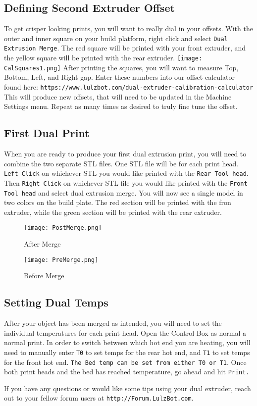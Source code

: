 \subsection{Defining Second Extruder Offset}
To get crisper looking prints, you will want to really dial in your offsets. With the outer and inner square on your build platform, right click and select \texttt{Dual Extrusion Merge}. The red square will be printed with your front extruder, and the yellow square will be printed with the rear extruder.
\texttt{[image: CalSquares1.png]}
After printing the squares, you will want to measure Top, Bottom, Left, and Right gap. Enter these numbers into our offset calculator found here: \texttt{https://www.lulzbot.com/dual-extruder-calibration-calculator} This will produce new offsets, that will need to be updated in the Machine Settings menu. Repeat as many times as desired to truly fine tune the offset. 

\subsection{First Dual Print}
When you are ready to produce your first dual extrusion print, you will need to combine the two separate STL files. One STL file will be for each print head. \texttt{Left Click} on whichever STL you would like printed with the \texttt{Rear Tool head}. Then \texttt{Right Click} on whichever STL file you would like printed with the \texttt{Front Tool head} and select dual extrusion merge. You will now see a single model in two colors on the build plate. The red section will be printed with the fron extruder, while the green section will be printed with the rear extruder. 
\begin{figure}[H]
\centering
\texttt{[image: PostMerge.png]}
\caption{After Merge}
\label{fig:After Merge}
\end{figure}

\begin{figure}
\centering
\texttt{[image: PreMerge.png]}
\caption{Before Merge}
\label{fig:Before Merge}
\end{figure}

\subsection{Setting Dual Temps}
After your object has been merged as intended, you will need to set the individual temperatures for each print head. Open the Control Box as normal a normal print. In order to switch between which hot end you are heating, you will need to manually enter \texttt{T0} to set temps for the rear hot end, and \texttt{T1} to set temps for the front hot end. \texttt{The Bed temp can be set from either T0 or T1}. Once both print heads and the bed has reached temperature, go ahead and hit \texttt{Print.}

If you have any questions or would like some tips using your dual extruder, reach out to your fellow forum users at \texttt{http://Forum.LulzBot.com}.

